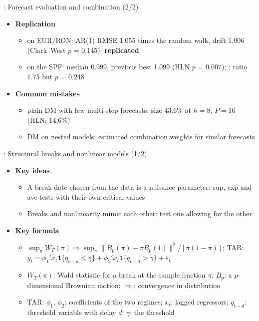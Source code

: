 \begin{frame}{: Forecast evaluation and combination (2/2)}
\itemsize{\small}
\begin{itemize}
    \item \textbf{Replication}
    \begin{itemize}
        \item {} on EUR/RON: AR(1) RMSE 1.055 times the random walk, drift 1.006 (Clark--West $p$ = 0.145): \textbf{replicated}
        \item {} on the SPF: median 0.999, previous best 1.099 (HLN $p$ = 0.007); : ratio 1.75 but $p$ = 0.248
    \end{itemize}
    \item \textbf{Common mistakes}
    \begin{itemize}
        \item plain DM with few multi-step forecasts: size 43.6\% at $h = 8$, $P = 16$ (HLN: 14.6\%)
        \item DM on nested models; estimated combination weights for similar forecasts
    \end{itemize}
\end{itemize}
\end{frame}

\begin{frame}{: Structural breaks and nonlinear models (1/2)}
\itemsize{\footnotesize}
\begin{itemize}
    \item \textbf{Key ideas}
    \begin{itemize}
        \item A break date chosen from the data is a nuisance parameter: sup, exp and ave tests with their own critical values
        \item Breaks and nonlinearity mimic each other: test one allowing for the other
    \end{itemize}
    \item \textbf{Key formula}
    \begin{itemize}
        \item $\sup_{\pi}W_T(\pi) \Rightarrow \sup_\pi \|B_p(\pi) - \pi B_p(1)\|^2/[\pi(1 - \pi)]$; TAR: $y_t = \phi_1'x_t\mathbf 1\{q_{t-d} \le \gamma\} + \phi_2'x_t\mathbf 1\{q_{t-d} > \gamma\} + \varepsilon_t$
        \item $W_T(\pi)$: Wald statistic for a break at the sample fraction $\pi$; $B_p$: a $p$-dimensional Brownian motion; $\Rightarrow$: convergence in distribution
        \item TAR: $\phi_1$, $\phi_2$: coefficients of the two regimes; $x_t$: lagged regressors; $q_{t-d}$: threshold variable with delay $d$; $\gamma$: the threshold
    \end{itemize}
\end{itemize}
\end{frame}

